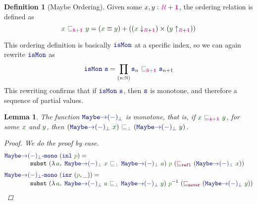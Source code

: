 \documentclass[twoside,11pt,openright]{report}
\theoremstyle{plain} %
\newtheorem{lem}[thm]{Lemma}
\theoremstyle{definition}
\newtheorem{defn}[thm]{Definition}%
\theoremstyle{remark}
\newcommand*{\term}[1]{\textcolor{green!30!black}{#1}} %
\newcommand*{\pathterm}[1]{\textcolor{green!65!red!75!black}{#1}}
\newcommand*{\type}[1]{\textcolor{magenta!90!black}{#1}}
\newcommand*{\unit}{\type{\textbf{1}}}
\newcommand*{\relation}[1]{\textcolor{gray!75!black}{\ensuremath{\mathtt{#1}}}}
\newcommand*{\function}[1]{\textcolor{blue!60!black}{\ensuremath{\mathtt{#1}}}}
\newcommand*{\constructor}[1]{\textcolor{purple!60!black}{\ensuremath{\mathtt{#1}}}}
\newcommand*{\sym}[1]{\ensuremath{#1^{-1}}}
\begin{document}
\begin{defn}[Maybe Ordering]
  \label{eq:maybe-order}
  Given some \(x,y : \type{R} + \unit\), the ordering relation is defined as
  \begin{equation}
    \term{x}~\relation{\sqsubseteq_{\type{R} + \unit}}~\term{y} = (\term{x} \equiv \term{y}) + ((\term{x}  \downarrow_{\type{R} + \unit}) \times (\term{y} \uparrow_{\type{R} + \unit}))
  \end{equation}
\end{defn}
\noindent This ordering definition is basically \(\function{isMon}\) at a specific index, so we can again rewrite \(\function{isMon}\) as
\begin{equation}
  \function{isMon}~\function{s} = \prod_{(n : \mathbb{N})} \function{s}_n~\relation{\sqsubseteq_{\type{R} + \unit}}~\function{s}_{n+1}
\end{equation}
This rewriting confirms that if \(\function{isMon}~\function{s}\), then \(\function{s}\) is monotone, and therefore a sequence of partial values.
\begin{lem}
  The function \(\function{Maybe{\rightarrow}(-)_\bot}\) is monotone, that is, if \(\term{x}~\relation{\sqsubseteq_{\type{A} + \unit}}~\term{y}\), for some \(\term{x}\) and \(\term{y}\), then \((\function{Maybe{\rightarrow}(-)_\bot}~\term{x})~\relation{\sqsubseteq_{\bot}}~(\function{Maybe{\rightarrow}(-)_\bot}~\term{y})\).
  \begin{proof}
    We do the proof by case.
    \begin{equation}
      \begin{aligned}
        &\function{Maybe{\rightarrow}(-)_\bot\text{-}mono}~(\function{inl}~\pathterm{p}) = \\[-1mm]
        &\qquad\qquad \mathtt{subst}~(\lambda\,\term{a},~\function{Maybe{\rightarrow}(-)_\bot}~\term{x}~\relation{\sqsubseteq_{\bot}}~\function{Maybe{\rightarrow}(-)_\bot}~\term{a})~\pathterm{p}~(\constructor{\sqsubseteq_{refl}}~(\function{Maybe{\rightarrow}(-)_\bot}~\term{x})) \\[1mm]
        &\function{Maybe{\rightarrow}(-)_\bot\text{-}mono}~(\function{inr}~(\pathterm{p}, \_)) = \\[-1mm]
        &\qquad\qquad \mathtt{subst}~(\lambda\,\term{a},~\function{Maybe{\rightarrow}(-)_\bot}~\term{a}~\relation{\sqsubseteq_{\bot}}~\function{Maybe{\rightarrow}(-)_\bot}~\term{y})~\sym{\pathterm{p}}~(\constructor{\sqsubseteq_{never}}~(\function{Maybe{\rightarrow}(-)_\bot}~\term{y}))
      \end{aligned}
    \end{equation}
  \end{proof}
\end{lem}
\end{document}
